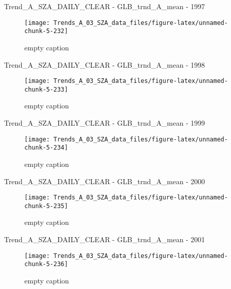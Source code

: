 \documentclass[
  10pt,
  a4paper,oneside]{article}
\begin{document}
Trend\_A\_SZA\_DAILY\_CLEAR - GLB\_trnd\_A\_mean - 1997

\begin{figure}[!ht]

{\centering \texttt{[image: Trends\_A\_03\_SZA\_data\_files/figure-latex/unnamed-chunk-5-232]} 

}

\caption{ empty caption }\label{fig:unnamed-chunk-5-232}
\end{figure}

Trend\_A\_SZA\_DAILY\_CLEAR - GLB\_trnd\_A\_mean - 1998

\begin{figure}[!ht]

{\centering \texttt{[image: Trends\_A\_03\_SZA\_data\_files/figure-latex/unnamed-chunk-5-233]} 

}

\caption{ empty caption }\label{fig:unnamed-chunk-5-233}
\end{figure}

Trend\_A\_SZA\_DAILY\_CLEAR - GLB\_trnd\_A\_mean - 1999

\begin{figure}[!ht]

{\centering \texttt{[image: Trends\_A\_03\_SZA\_data\_files/figure-latex/unnamed-chunk-5-234]} 

}

\caption{ empty caption }\label{fig:unnamed-chunk-5-234}
\end{figure}

Trend\_A\_SZA\_DAILY\_CLEAR - GLB\_trnd\_A\_mean - 2000

\begin{figure}[!ht]

{\centering \texttt{[image: Trends\_A\_03\_SZA\_data\_files/figure-latex/unnamed-chunk-5-235]} 

}

\caption{ empty caption }\label{fig:unnamed-chunk-5-235}
\end{figure}

Trend\_A\_SZA\_DAILY\_CLEAR - GLB\_trnd\_A\_mean - 2001

\begin{figure}[!ht]

{\centering \texttt{[image: Trends\_A\_03\_SZA\_data\_files/figure-latex/unnamed-chunk-5-236]} 

}

\caption{ empty caption }\label{fig:unnamed-chunk-5-236}
\end{figure}
\end{document}
